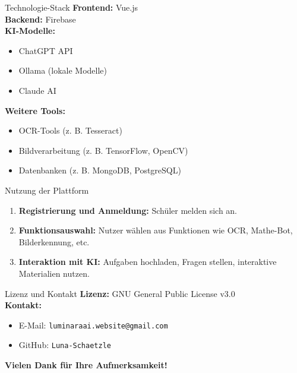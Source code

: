 \documentclass{beamer}
\begin{document}
\begin{frame}{Technologie-Stack}
    \textbf{Frontend:} Vue.js \\
    \textbf{Backend:} Firebase \\
    \textbf{KI-Modelle:}
    \begin{itemize}
        \item ChatGPT API
        \item Ollama (lokale Modelle)
        \item Claude AI
    \end{itemize}
    \textbf{Weitere Tools:}
    \begin{itemize}
        \item OCR-Tools (z. B. Tesseract)
        \item Bildverarbeitung (z. B. TensorFlow, OpenCV)
        \item Datenbanken (z. B. MongoDB, PostgreSQL)
    \end{itemize}
\end{frame}

\begin{frame}{Nutzung der Plattform}
    \begin{enumerate}
        \item \textbf{Registrierung und Anmeldung:} Schüler melden sich an.
        \item \textbf{Funktionsauswahl:} Nutzer wählen aus Funktionen wie OCR, Mathe-Bot, Bilderkennung, etc.
        \item \textbf{Interaktion mit KI:} Aufgaben hochladen, Fragen stellen, interaktive Materialien nutzen.
    \end{enumerate}
\end{frame}

\begin{frame}{Lizenz und Kontakt}
    \textbf{Lizenz:} GNU General Public License v3.0 \\
    \vspace{1cm}
    \textbf{Kontakt:}
    \begin{itemize}
        \item E-Mail: \texttt{luminaraai.website@gmail.com}
        \item GitHub: \texttt{Luna-Schaetzle}
    \end{itemize}
\end{frame}

\begin{frame}
    \centering
    \textbf{Vielen Dank für Ihre Aufmerksamkeit!}
\end{frame}
\end{document}
